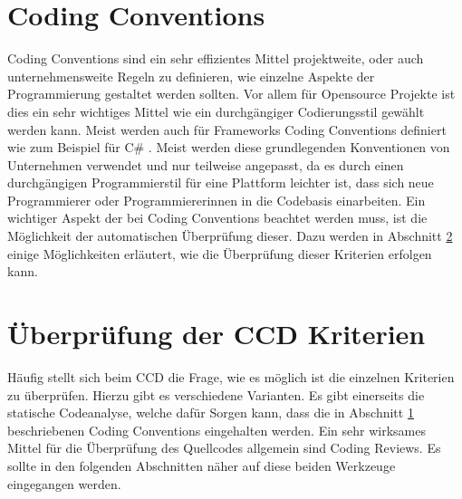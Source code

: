 \newpage
\section{Coding Conventions}
\label{cha:CodingConventions}
Coding Conventions sind ein sehr effizientes Mittel projektweite, oder auch unternehmensweite Regeln zu definieren, wie einzelne Aspekte der Programmierung gestaltet werden sollten. Vor allem für Opensource Projekte ist dies ein sehr wichtiges Mittel wie ein durchgängiger Codierungsstil gewählt werden kann. Meist werden auch für Frameworks Coding Conventions definiert wie zum Beispiel für C\# \cite{CSHARPCoding}. Meist werden diese grundlegenden Konventionen von Unternehmen verwendet und nur teilweise angepasst, da es durch einen durchgängigen Programmierstil für eine Plattform leichter ist, dass sich neue Programmierer oder Programmiererinnen in die Codebasis einarbeiten. Ein wichtiger Aspekt der bei Coding Conventions beachtet werden muss, ist die Möglichkeit der automatischen Überprüfung dieser. Dazu werden in Abschnitt \ref{cha:CheckingCCDCriterias} einige Möglichkeiten erläutert, wie die Überprüfung dieser Kriterien erfolgen kann.

 
\section{Überprüfung der CCD Kriterien}
\label{cha:CheckingCCDCriterias}
\SuperPar Häufig stellt sich beim CCD die Frage, wie es möglich ist die einzelnen Kriterien zu überprüfen. Hierzu gibt es verschiedene Varianten. Es gibt einerseits die statische Codeanalyse, welche dafür Sorgen kann, dass die in Abschnitt \ref{cha:CodingConventions} beschriebenen Coding Conventions eingehalten werden. Ein sehr wirksames Mittel für die Überprüfung des Quellcodes allgemein sind Coding Reviews. Es sollte in den folgenden Abschnitten näher auf diese beiden Werkzeuge eingegangen werden.

